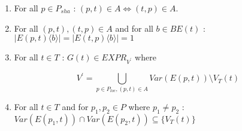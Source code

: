 \begin{definition}
\begin{enumerate}
\item For all $p \in P_{sha}$ : $(p, t) \in A \Leftrightarrow (t, p) \in A$.
%
%
%
\item For all $(p, t), (t, p) \in A$ and for all $b \in BE(t)$ :\\
$\mid E(p, t)\langle b \rangle \mid = \mid E(t, p)\langle b \rangle \mid = 1$

\item For all $t \in T$ : $G(t) \in EXPR_{V^{\prime}}$ where

\begin{equation*}
V^{\prime} = \bigcup_{p \in P_{loc}, (p, t) \in A} Var(E(p, t)) \setminus {V_{T}(t)}
\end{equation*}

\item For all $t \in T$ and for $p_{1}, p_{2} \in P$ where $p_{1} \neq p_{2}$ :\\
$Var(E(p_{1}, t)) \cap Var(E(p_{2}, t)) \subseteq \{V_{T}(t)\}$


\end{enumerate}
\end{definition}

